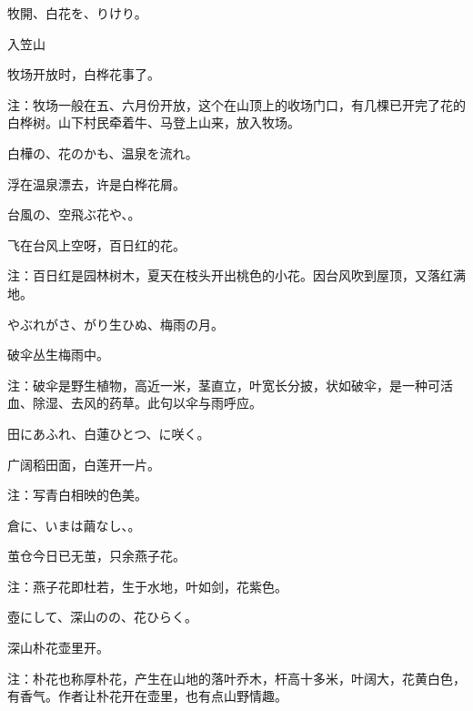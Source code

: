 \begin{haiku}
    {\FH 牧開、白花を、りけり。}

    {\FK 入笠山}

    {\FK 牧场开放时，白桦花事了。}

    {\FT 注：牧场一般在五、六月份开放，这个在山顶上的收场门口，有几棵已开完了花的白桦树。山下村民牵着牛、马登上山来，放入牧场。}
\end{haiku}

\begin{haiku}
    {\FH 白樺の、花のかも、温泉を流れ。}

    {\FK 浮在温泉漂去，许是白桦花屑。}
\end{haiku}

\begin{haiku}
    {\FH 台風の、空飛ぶ花や、。}

    {\FK 飞在台风上空呀，百日红的花。}

    {\FT 注：百日红是园林树木，夏天在枝头开出桃色的小花。因台风吹到屋顶，又落红满地。}
\end{haiku}

\begin{haiku}
    {\FH やぶれがさ、がり生ひぬ、梅雨の月。}

    {\FK 破伞丛生梅雨中。}

    {\FT 注：破伞是野生植物，高近一米，茎直立，叶宽长分披，状如破伞，是一种可活血、除湿、去风的药草。此句以伞与雨呼应。}
\end{haiku}

\begin{haiku}
    {\FH 田にあふれ、白蓮ひとつ、に咲く。}

    {\FK 广阔稻田面，白莲开一片。}

    {\FT 注：写青白相映的色美。}
\end{haiku}

\begin{haiku}
    {\FH {}倉に、いまは繭なし、。}

    {\FK 茧仓今日已无茧，只余燕子花。}

    {\FT 注：燕子花即杜若，生于水地，叶如剑，花紫色。}
\end{haiku}

\begin{haiku}
    {\FH 壺にして、深山のの、花ひらく。}

    {\FK 深山朴花壶里开。}

    {\FT 注：朴花也称厚朴花，产生在山地的落叶乔木，杆高十多米，叶阔大，花黄白色，有香气。作者让朴花开在壶里，也有点山野情趣。}
\end{haiku}

